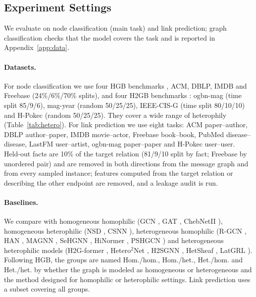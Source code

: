 \documentclass{article}
\begin{document}
\subsection{Experiment Settings}
We evaluate on node classification (main task) and link prediction; graph classification checks that the model covers the task and is reported in Appendix~\ref{app:data}.

\paragraph{Datasets.} For node classification we use four HGB benchmarks \cite{lv2021hgb}, ACM, DBLP, IMDB and Freebase (24\%/6\%/70\% splits), and four H2GB benchmarks \cite{lin2025heterophily}: ogbn-mag (time split 85/9/6), mag-year (random 50/25/25), IEEE-CIS-G (time split 80/10/10) and H-Pokec (random 50/25/25). They cover a wide range of heterophily (Table~\ref{tab:hetero}). For link prediction we use eight tasks: ACM paper--author, DBLP author--paper, IMDB movie--actor, Freebase book--book, PubMed disease--disease, LastFM user--artist, ogbn-mag paper--paper and H-Pokec user--user. Held-out facts are 10\% of the target relation (81/9/10 split by fact; Freebase by unordered pair) and are removed in both directions from the message graph and from every sampled instance; features computed from the target relation or describing the other endpoint are removed, and a leakage audit is run.

\paragraph{Baselines.} We compare with homogeneous homophilic (GCN \cite{kipf2017gcn}, GAT \cite{velickovic2018gat}, ChebNetII \cite{he2022chebnetii}), homogeneous heterophilic (NSD \cite{bodnar2022neural}, CSNN \cite{ribeiro2026cooperative}), heterogeneous homophilic (R-GCN \cite{schlichtkrull2018rgcn}, HAN \cite{wang2019han}, MAGNN \cite{fu2020magnn}, SeHGNN \cite{yang2023sehgnn}, HiNormer \cite{mao2023hinormer}, PSHGCN \cite{he2024spectral}) and heterogeneous heterophilic models (H2G-former \cite{lin2025heterophily}, Hetero$^2$Net \cite{li2025hetero2net}, H2SGNN \cite{lu2026addressing}, HetSheaf \cite{braithwaite2024heterogeneous}, LatGRL \cite{shen2025heterophily}). Following HGB, the groups are named Hom./hom., Hom./het., Het./hom. and Het./het. by whether the graph is modeled as homogeneous or heterogeneous and the method designed for homophilic or heterophilic settings. Link prediction uses a subset covering all groups.
\end{document}
